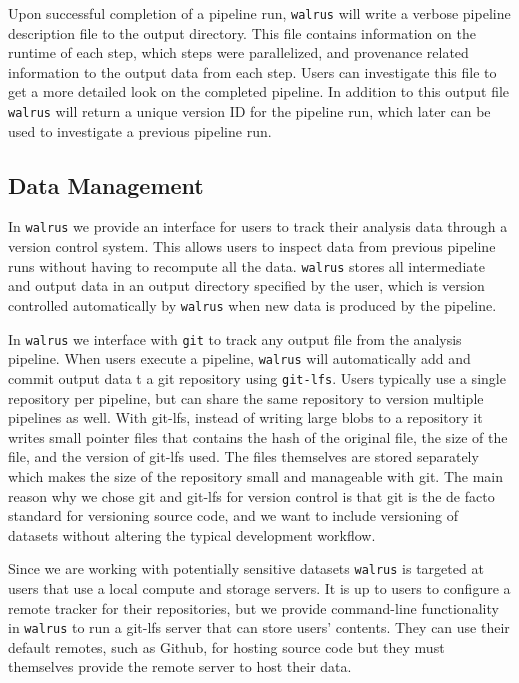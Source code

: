 Upon successful completion of a pipeline run, \texttt{walrus} will write a
verbose pipeline description file to the output directory. This file contains
information on the runtime of each step, which steps were parallelized, and
provenance related information to the output data from each step. Users can
investigate this file to get a more detailed look on the completed pipeline. In
addition to this output file \texttt{walrus} will return a unique version ID for
the pipeline run, which later can be used to investigate a previous pipeline
run. 

\subsection{Data Management}
In \texttt{walrus} we provide an interface for users to track their analysis
data through a version control system. This allows users to inspect data from
previous pipeline runs without having to recompute all the data. \texttt{walrus}
stores all intermediate and output data in an output directory specified by the
user, which is version controlled automatically by \texttt{walrus} when new data
is produced by the pipeline. 

In \texttt{walrus} we interface with \texttt{git} to track any output file from
the analysis pipeline. When users execute a pipeline, \texttt{walrus} will 
automatically add and commit output data t a git repository using
\texttt{git-lfs}. 
Users typically use a single repository per pipeline, but can share the same 
repository to version multiple pipelines as well. With git-lfs, instead of
writing large blobs to a repository it writes small pointer files that contains
the hash of the original file, the size of the file, and the version of git-lfs
used. The files themselves are stored separately which makes the size of the
repository small and manageable with git. The main reason why we chose git and
git-lfs for version control is that git is the de facto standard for versioning
source code, and we want to include versioning of datasets without altering the
typical development workflow. 



Since we are working with potentially sensitive datasets \texttt{walrus} is
targeted at users that use a local compute and storage servers. It is up to
users to configure a remote tracker for their repositories, but we provide
command-line functionality in \texttt{walrus} to run a git-lfs server that can
store users' contents.  They can use their default remotes, such as Github, for
hosting source code but they must themselves provide the remote server to host
their data.

